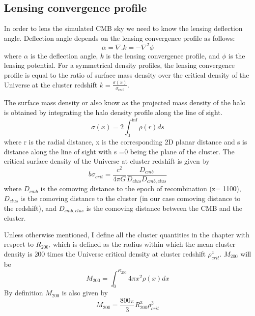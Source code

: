   \subsection{Lensing convergence profile}
  In order to lens the simulated CMB sky we need to know the lensing deflection angle.
  Deflection angle depends on the lensing convergence profile as follows:
\begin{equation}
 \alpha = \nabla. k = -\nabla^{2} \phi
 \end{equation}
 where $\alpha$ is the deflection angle, $k$ is the lensing convergence profile, and $\phi$ is the lensing potential.
 For a symmetrical density profiles, the lensing convergence profile is equal to the ratio of surface mass density over the critical density of the Universe at the cluster redshift $k = \frac{\sigma(x)}{\sigma_{crit}}$.
 
The surface mass density or also know as the projected mass density of the halo is obtained by integrating the halo density profile along the line of sight. 
 \begin{equation}
 \sigma(x) = 2 \int^{\inf}_{0} \rho(r) ds
 \label{eq:surface_density}
 \end{equation}
 where r is the radial distance, x is the corresponding 2D planar distance and s is distance along the line of sight with s =0 being the plane of the cluster.
 The critical surface density of the Universe at cluster redshift is given by
 \begin{equation}b
 \sigma_{crit} = \frac{c^{2}}{4\pi G} \frac{D_{cmb}}{D_{clus}D_{cmb,clus}}
 \end{equation}
 where $D_{cmb}$ is the comoving distance to the epoch of recombination (z= 1100), $D_{clus}$ is the comoving distance to the cluster (in our case comoving distance to the redshift), and $D_{cmb,clus}$ is the comoving distance between the CMB and the cluster.
 
 Unless otherwise mentioned, I define all the cluster quantities in the chapter with respect to $R_{200}$, which is defined as the radius within which the mean cluster density is 200 times the Universe critical density at cluster redshift $\rho^{z}_{crit}$. $M_{200}$ will be 
 \begin{equation}
 M_{200} = \int^{R_{200}}_{0}  4\pi x^{2} \rho(x) dx
 \end{equation}
 By definition $M_{200}$ is also given by
 \begin{equation}
 M_{200} = \frac{800\pi}{3} R^{3}_{200} \rho^{3}_{crit}
 \end{equation}
 
